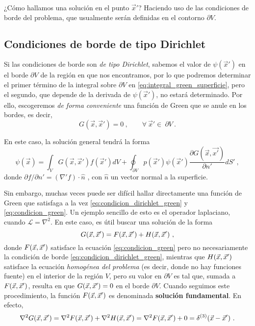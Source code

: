¿Cómo hallamos una solución en el punto $\vec{x}'$? Haciendo uso de las condiciones de borde del problema, que usualmente serán definidas en el contorno $\partial V$.

\subsection{Condiciones de borde de tipo Dirichlet}

Si las condiciones de borde son \emph{de tipo Dirichlet}, sabemos el valor de $\psi(\vec{x}')$ en el borde $\partial V$ de la región en que nos encontramos, por lo que podremos determinar el primer término de la integral sobre $\partial V$ en \eqref{eq:integral_green_superficie}, pero el segundo, que depende de la derivada de $\psi(\vec{x}')$, no estará determinado. Por ello, escogeremos \emph{de forma conveniente} una función de Green que se anule en los bordes, es decir,
\begin{equation}\label{eq:condicion_dirichlet_green}
    G(\vec{x}, \vec{x}') = 0 \ , \qquad \forall \ \vec{x}' \in \ \partial V \ .
\end{equation}

En este caso, la solución general tendrá la forma
\begin{equation}\label{eq:solucion_dirichlet}
    \psi(\vec{x}) = \int_V G(\vec{x}, \vec{x}') f(\vec{x}') dV + \oint_{\partial V} p(\vec{x}') \psi(\vec{x}') \frac{\partial G(\vec{x}, \vec{x'})}{\partial n'} dS' \ ,
\end{equation}
donde $\partial f/\partial n' = (\nabla' f) \cdot \hat{n}$ , con 
$\hat{n}$ un vector normal a la superficie.

Sin embargo, muchas veces puede ser difícil hallar directamente una función de Green que satisfaga a la vez \eqref{eq:condicion_dirichlet_green} y \eqref{eq:condicion_green}. Un ejemplo sencillo de esto es el operador laplaciano, cuando $\mathcal{L} = \nabla^2$. En este caso, es útil buscar una solución de la forma
\begin{equation}\label{eq:green_fundamental}
    G(\vec{x}, \vec{x}') = F(\vec{x}, \vec{x}') + H(\vec{x}, \vec{x}') \ ,
\end{equation}
donde $F(\vec{x}, \vec{x}')$ satisface la ecuación \eqref{eq:condicion_green} pero no necesariamente la condición de borde \eqref{eq:condicion_dirichlet_green}, mientras que $H(\vec{x}, \vec{x}')$ satisface la ecuación \emph{homogénea del problema} (es decir, donde no hay funciones fuente) en el interior de la región $V$, pero su valor en $\partial V$ es tal que, sumada a $F(\vec{x}, \vec{x}')$, resulta en que $G(\vec{x},\vec{x}') = 0$ en el borde $\partial V$. Cuando seguimos este procedimiento, la función $F(\vec{x},\vec{x}')$ es denominada \textbf{solución fundamental}. En efecto,
\begin{equation}
    \nabla^2 G(\vec{x}, \vec{x}') = \nabla^2 F(\vec{x}, \vec{x}') + \nabla^2 H(\vec{x}, \vec{x}') = \nabla^2 F(\vec{x}, \vec{x}') + 0 = \delta^{(3)}(\vec{x} - \vec{x}') \ .
\end{equation}

